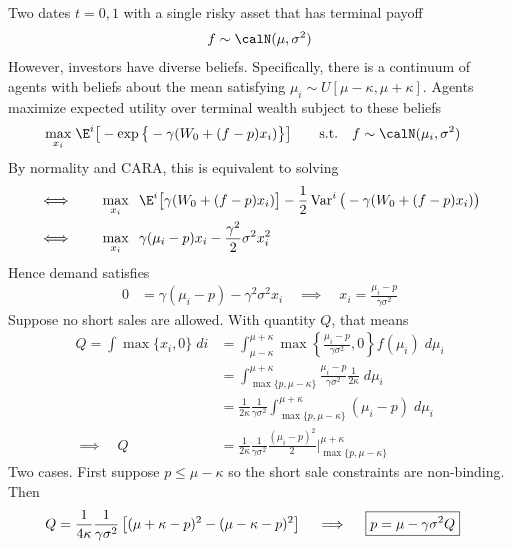 \documentclass[12pt]{article}
\theoremstyle{plain}
\theoremstyle{definition}
\theoremstyle{remark}
\newcommand{\Var}{\operatorname{Var}}
\begin{document}
Two dates $t=0,1$ with a single risky asset that has terminal payoff
\begin{align*}
  f \sim\calN(\mu,\sigma^2)
\end{align*}
However, investors have diverse beliefs.
Specifically, there is a continuum of agents with beliefs about the mean
satisfying $\mu_i\sim U[\mu-\kappa,\mu+\kappa]$.
Agents maximize expected utility over terminal wealth subject to these
beliefs
\begin{align*}
  \max_{x_i}
  \;&
  \E^i\big[
    -\exp\big\{
      -\gamma(W_0 + (f-p)x_i)
    \big\}
  \big]
  \qquad
  \text{s.t.}\quad
  f \sim\calN(\mu_i,\sigma^2)
\end{align*}
By normality and CARA, this is equivalent to solving
\begin{align*}
  \iff\qquad
  &\max_{x_i}
  \;\;
  \E^i\big[
      \gamma(W_0 + (f-p)x_i)
  \big]
  -
  \frac{1}{2}
  \Var^i\big(
      -\gamma(W_0 + (f-p)x_i)
  \big)
  \\
  \iff\qquad
  &\max_{x_i}
  \;\;
  \gamma(\mu_i-p)x_i
  -
  \frac{\gamma^2}{2}\sigma^2x^2_i
\end{align*}
Hence demand satisfies
\begin{align*}
  0&=
  \gamma(\mu_i-p)
  -
  \gamma^2\sigma^2
  x_i
  \quad\implies\quad
  x_i
  =
  \frac{\mu_i-p}{\gamma\sigma^2}
\end{align*}
Suppose no short sales are allowed.
With quantity $Q$, that means
\begin{align*}
  Q
  = \int \max\{x_i,0\}\;di
  &=
  \int_{\mu-\kappa}^{\mu+\kappa}
  \max\left\{\frac{\mu_i-p}{\gamma\sigma^2},0\right\}
  f(\mu_i)
  \;d\mu_i
  \\
  &=
  \int_{\max\{p,\mu-\kappa\}}^{\mu+\kappa}
  \frac{\mu_i-p}{\gamma\sigma^2}
  \frac{1}{2\kappa}
  \;d\mu_i
  \\
  &=
  \frac{1}{2\kappa}
  \frac{1}{\gamma\sigma^2}
  \int_{\max\{p,\mu-\kappa\}}^{\mu+\kappa}
  (\mu_i-p)
  \;d\mu_i
  \\
  \implies\quad
  Q
  &=
  \frac{1}{2\kappa}
  \frac{1}{\gamma\sigma^2}
  \frac{(\mu_i-p)^2}{2}|_{\max\{p,\mu-\kappa\}}^{\mu+\kappa}
\end{align*}
Two cases. First suppose $p\leq \mu-\kappa$ so the short sale
constraints are non-binding. Then
\begin{align*}
  Q
  &=
  \frac{1}{4\kappa}
  \frac{1}{\gamma\sigma^2}
  \left[
  (\mu+\kappa-p)^2
  -
  (\mu-\kappa-p)^2
  \right]
  \quad\implies\quad
  \boxed{%
    p = \mu -\gamma\sigma^2 Q
  }
\end{align*}
\end{document}
